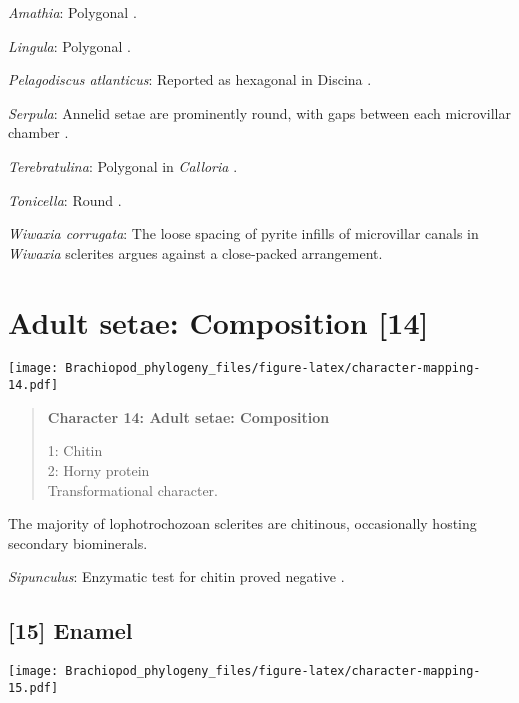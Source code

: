 \documentclass[openany]{book}
\theoremstyle{definition}
\theoremstyle{definition}
\theoremstyle{definition}
\theoremstyle{remark}
\begin{document}
\hypertarget{Amathia-coding-13}{}
\emph{Amathia}: Polygonal \citep{Gordon1975}.

\hypertarget{Lingula-coding-13}{}
\emph{Lingula}: Polygonal \citep{Luter2000}.

\hypertarget{Pelagodiscus_atlanticus-coding-13}{}
\emph{Pelagodiscus atlanticus}: Reported as hexagonal in Discina
\citep{Luter2000}.

\hypertarget{Serpula-coding-13}{}
\emph{Serpula}: Annelid setae are prominently round, with gaps between
each microvillar chamber \citep{Orrhage1971}.

\hypertarget{Terebratulina-coding-13}{}
\emph{Terebratulina}: Polygonal in \emph{Calloria} \citep{Luter2000}.

\hypertarget{Tonicella-coding-13}{}
\emph{Tonicella}: Round \citep{Fischer1980}.

\hypertarget{Wiwaxia_corrugata-coding-13}{}
\emph{Wiwaxia corrugata}: The loose spacing of pyrite infills of
microvillar canals in \emph{Wiwaxia} sclerites \citep{Smith2014} argues
against a close-packed arrangement.

\section{Adult setae: Composition
{[}14{]}}\label{adult-setae-composition-14}

\texttt{[image: Brachiopod\_phylogeny\_files/figure-latex/character-mapping-14.pdf]}

\begin{quote}
\textbf{Character 14: Adult setae: Composition}

1: Chitin\\
2: Horny protein\\
Transformational character.
\end{quote}

The majority of lophotrochozoan sclerites are chitinous, occasionally
hosting secondary biominerals.

\hypertarget{Sipunculus-coding-14}{}
\emph{Sipunculus}: Enzymatic test for chitin proved negative
\citep{Rice1993}.

\subsection*{{[}15{]} Enamel}\label{enamel}

\texttt{[image: Brachiopod\_phylogeny\_files/figure-latex/character-mapping-15.pdf]}
\end{document}
